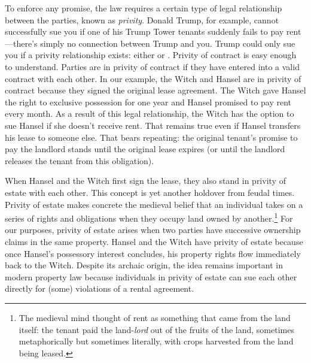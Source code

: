 To enforce any promise, the law requires a certain type of legal relationship
between the parties, known as \textit{privity}.  Donald Trump, for example,
cannot successfully sue you if one of his Trump Tower tenants suddenly fails to
pay rent---there's simply no connection between Trump and you.  Trump could
only sue you if a privity relationship exists: either  or .  Privity of contract is easy enough to
understand.  Parties are in privity of contract if they have entered into a
valid contract with each other.  In our example, the Witch and Hansel are in
privity of contract because they signed the original lease agreement.  The
Witch gave Hansel the right to exclusive possession for one year and Hansel
promised to pay rent every month.  As a result of this legal relationship, the
Witch has the option to sue Hansel if she doesn't receive rent.  That remains
true even if Hansel transfers his lease to someone else.  That bears repeating:
the original tenant's promise to pay the landlord stands until the original
lease expires (or until the landlord releases the tenant from this obligation).
 
When Hansel and the Witch first sign the lease, they also stand in privity of
estate with each other.  This concept is yet another holdover from feudal
times.  Privity of estate makes concrete the medieval belief that an individual
takes on a series of rights and obligations when they occupy land owned by
another.\footnote{The medieval mind thought of rent as something that came
from the land itself: the tenant paid the land-\textit{lord} out of the fruits
of the land, sometimes metaphorically but sometimes literally, with crops
harvested from the land being leased.}  For our purposes, privity of estate
arises when two parties have successive ownership claims in the same property.
Hansel and the Witch have privity of estate because once Hansel's possessory
interest concludes, his property rights flow immediately back to the Witch. 
Despite its archaic origin, the idea remains important in modern property law
because individuals in privity of estate can sue each other directly for (some)
violations of a rental agreement.

